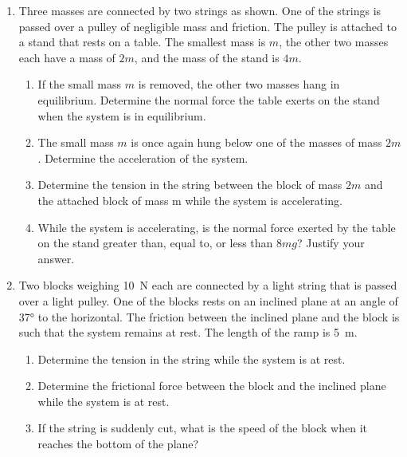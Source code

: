 \documentclass{../../oss-apphys}
\begin{document}
\begin{enumerate}[leftmargin=15pt]

\item Three masses are connected by two strings as shown. One of the strings
  is passed over a pulley of negligible mass and friction. The pulley is
  attached to a stand that rests on a table. The smallest mass is $m$, the
  other two masses each have a mass of $2m$, and the mass of the stand is $4m$.
  \begin{enumerate}[leftmargin=18pt]
  \item If the small mass $m$ is removed, the other two masses hang in
    equilibrium. Determine the normal force the table exerts on the stand
    when the system is in equilibrium.
    
  \item The small mass $m$ is once again hung below one of the masses of mass
    $2m$. Determine the acceleration of the system.

  \item Determine the tension in the string between the block of mass $2m$ and
    the attached block of mass m while the system is accelerating.

  \item While the system is accelerating, is the normal force exerted by the
    table on the stand greater than, equal to, or less than $8mg$? Justify your
    answer.
  \end{enumerate}
  \newpage
\item Two blocks weighing \SI{10}{\newton} each are connected by a light string
  that is passed over a light pulley. One of the blocks rests on an inclined
  plane at an angle of \ang{37} to the horizontal. The friction between the
  inclined plane and the block is such that the system remains at rest. The
  length of the ramp is \SI{5}{\metre}.
  \begin{enumerate}[leftmargin=18pt]
  \item Determine the tension in the string while the system is at rest.
  \item Determine the frictional force between the block and the inclined plane
    while the system is at rest.
  \item If the string is suddenly cut, what is the speed of the block when it
    reaches the bottom of the plane?
  \end{enumerate}
\end{enumerate}
\end{document}
